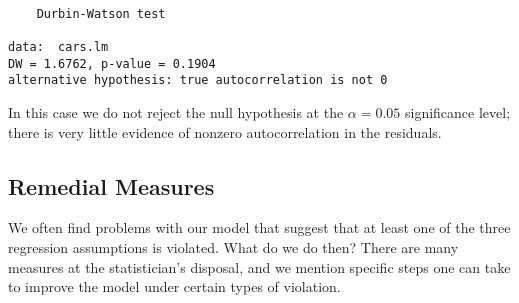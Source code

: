 \documentclass[]{book}
\numberwithin{equation}{chapter}
\numberwithin{figure}{chapter}
\theoremstyle{plain}
\theoremstyle{definition}
\theoremstyle{remark}
\theoremstyle{definition}
\theoremstyle{definition}
\theoremstyle{remark}
\begin{document}
\begin{verbatim}

    Durbin-Watson test

data:  cars.lm
DW = 1.6762, p-value = 0.1904
alternative hypothesis: true autocorrelation is not 0
\end{verbatim}

In this case we do not reject the null hypothesis at the \(\alpha=0.05\)
significance level; there is very little evidence of nonzero
autocorrelation in the residuals.

\subsection{Remedial Measures}\label{remedial-measures}

We often find problems with our model that suggest that at least one of
the three regression assumptions is violated. What do we do then? There
are many measures at the statistician's disposal, and we mention
specific steps one can take to improve the model under certain types of
violation.
\end{document}
